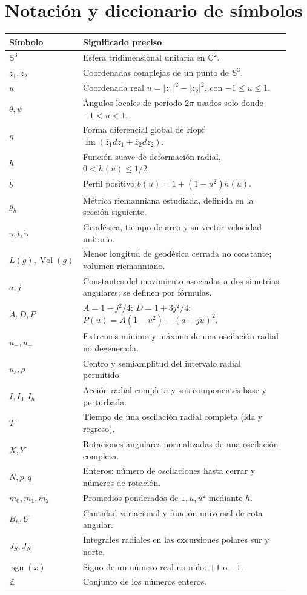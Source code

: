 \documentclass[11pt,a4paper]{article}
\theoremstyle{remark}\newtheorem{remark}[theorem]{Observación}
\newcommand{\Sthree}{\mathbb S^3}
\newcommand{\C}{\mathbb C}
\newcommand{\Z}{\mathbb Z}
\newcommand{\Vol}{\operatorname{Vol}}
\newcommand{\sgn}{\operatorname{sgn}}
\begin{document}
\section{Notación y diccionario de símbolos}
\begin{longtable}{p{0.19\linewidth}p{0.73\linewidth}}
\toprule
Símbolo & Significado preciso \\
\midrule
$\Sthree$ & Esfera tridimensional unitaria en $\C^2$.\\
$z_1,z_2$ & Coordenadas complejas de un punto de $\Sthree$.\\
$u$ & Coordenada real $u=|z_1|^2-|z_2|^2$, con $-1\leq u\leq1$.\\
$\theta,\psi$ & Ángulos locales de período $2\pi$ usados solo donde $-1<u<1$.\\
$\eta$ & Forma diferencial global de Hopf $\operatorname{Im}(\bar z_1dz_1+\bar z_2dz_2)$.\\
$h$ & Función suave de deformación radial, $0<h(u)\leq1/2$.\\
$b$ & Perfil positivo $b(u)=1+(1-u^2)h(u)$.\\
$g_h$ & Métrica riemanniana estudiada, definida en la sección siguiente.\\
$\gamma,t,\dot\gamma$ & Geodésica, tiempo de arco y su vector velocidad unitario.\\
$L(g),\Vol(g)$ & Menor longitud de geodésica cerrada no constante; volumen riemanniano.\\
$a,j$ & Constantes del movimiento asociadas a dos simetrías angulares; se definen por fórmulas.\\
$A,D,P$ & $A=1-j^2/4$; $D=1+3j^2/4$; $P(u)=A(1-u^2)-(a+ju)^2$.\\
$u_-,u_+$ & Extremos mínimo y máximo de una oscilación radial no degenerada.\\
$u_c,\rho$ & Centro y semiamplitud del intervalo radial permitido.\\
$I,I_0,I_h$ & Acción radial completa y sus componentes base y perturbada.\\
$T$ & Tiempo de una oscilación radial completa (ida y regreso).\\
$X,Y$ & Rotaciones angulares normalizadas de una oscilación completa.\\
$N,p,q$ & Enteros: número de oscilaciones hasta cerrar y números de rotación.\\
$m_0,m_1,m_2$ & Promedios ponderados de $1,u,u^2$ mediante $h$.\\
$B_h,U$ & Cantidad variacional y función universal de cota angular.\\
$J_S,J_N$ & Integrales radiales en las excursiones polares sur y norte.\\
$\sgn(x)$ & Signo de un número real no nulo: $+1$ o $-1$.\\
$\Z$ & Conjunto de los números enteros.\\
\bottomrule
\end{longtable}
\end{document}
